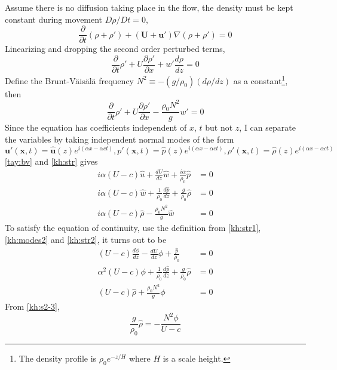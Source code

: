 Assume there is no diffusion taking place in the flow, the density
must be kept constant during movement $D\rho/Dt=0$,
\begin{equation*}
    \frac{\partial}{\partial
    t}(\rho+\rho')+(\mathbf{U}+\mathbf{u}')\nabla(\rho+\rho')=0
\end{equation*}
\newslide
Linearizing and dropping the second order perturbed terms,
\begin{equation*}
    \frac{\partial}{\partial
    t}\rho'+U\frac{\partial\rho'}{\partial
    x}+w'\frac{d\rho}{dz}=0
\end{equation*}
Define the Brunt-V\"{a}is\"{a}l\"{a} frequency
$N^2\equiv-(g/\rho_0)(d\rho/dz)$ as a constant\footnote{The density
profile is $\rho_0e^{-z/H}$ where $H$ is a scale height.}, then
\begin{equation}\label{tay:bv}
    \frac{\partial}{\partial
    t}\rho'+U\frac{\partial\rho'}{\partial
    x}-\frac{\rho_0N^2}{g}w'=0
\end{equation}
\newslide
Since the equation has coefficients independent of $x$, $t$ but not
$z$, I can separate the variables by taking independent normal modes
of the form
\begin{equation}\label{kh:modes3}
    \mathbf{u}'(\mathbf{x},t)=\hat{\mathbf{u}}(z)e^{i(\alpha x-\alpha c
    t)},
    p'(\mathbf{x},t)=\hat{p}(z)e^{i(\alpha x-\alpha c t)},
    \rho'(\mathbf{x},t)=\hat{\rho}(z)e^{i(\alpha x-\alpha c t)}
\end{equation}
\eqref{tay:bv} and \eqref{kh:str} gives
\begin{subequations}\label{kh:s1}
\begin{align}
i\alpha(U-c)\hat{u}+\frac{dU}{dz}\hat{w}+\frac{i\alpha}{\rho_0}\hat{p}&=0\label{kh:s1-1}\\
i\alpha(U-c)\hat{w}+\frac{1}{\rho_0}\frac{d\hat{p}}{dz}+\frac{g}{\rho_0}\hat{\rho}&=0\label{kh:s1-2}\\
i\alpha(U-c)\hat{\rho}-\frac{\rho_0N^2}{g}\hat{w}&=0\label{kh:s1-3}
\end{align}
\end{subequations}
\newslide
To satisfy the equation of continuity, use the definition from
\eqref{kh:str1}, \eqref{kh:modes2} and \eqref{kh:str2}, it turns out
to be
\begin{subequations}\label{kh:s2}
\begin{align}
(U-c)\frac{d\phi}{dz}-\frac{dU}{dz}\phi+\frac{\hat{p}}{\rho_0}&=0\label{kh:s2-1}\\
\alpha^2(U-c)\phi+\frac{1}{\rho_0}\frac{d\hat{p}}{dz}+\frac{g}{\rho_0}\hat{\rho}&=0\label{kh:s2-2}\\
(U-c)\hat{\rho}+\frac{\rho_0N^2}{g}\phi&=0\label{kh:s2-3}
\end{align}
\end{subequations}
\newslide
From \eqref{kh:s2-3},
\begin{equation}\label{kh:s3}
    \frac{g}{\rho_0}\hat{\rho}=-\frac{N^2\phi}{U-c}
\end{equation}

